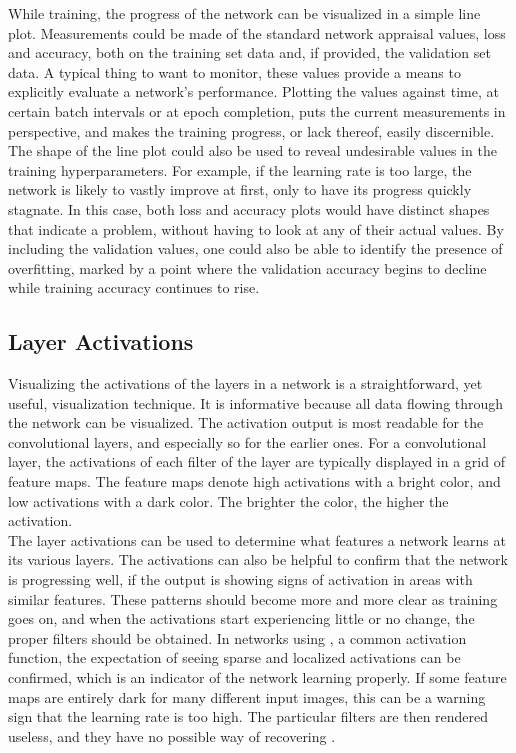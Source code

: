 While training, the progress of the network can be visualized in a simple line plot. Measurements could be made of the standard network appraisal values, loss and accuracy, both on the training set data and, if provided, the validation set data. A typical thing to want to monitor, these values provide a means to explicitly evaluate a network's performance. Plotting the values against time, at certain batch intervals or at epoch completion, puts the current measurements in perspective, and makes the training progress, or lack thereof, easily discernible. The shape of the line plot could also be used to reveal undesirable values in the training hyperparameters. For example, if the learning rate is too large, the network is likely to vastly improve at first, only to have its progress quickly stagnate. In this case, both loss and accuracy plots would have distinct shapes that indicate a problem, without having to look at any of their actual values. By including the validation values, one could also be able to identify the presence of overfitting, marked by a point where the validation accuracy begins to decline while training accuracy continues to rise.

\subsection{Layer Activations}

Visualizing the activations of the layers in a network is a straightforward, yet useful, visualization technique. It is informative because all data flowing through the network can be visualized. The activation output is most readable for the convolutional layers, and especially so for the earlier ones. For a convolutional layer, the activations of each filter of the layer are typically displayed in a grid of feature maps. The feature maps denote high activations with a bright color, and low activations with a dark color. The brighter the color, the higher the activation. \\

\noindent The layer activations can be used to determine what features a network learns at its various layers. The activations can also be helpful to confirm that the network is progressing well, if the output is showing signs of activation in areas with similar features. These patterns should become more and more clear as training goes on, and when the activations start experiencing little or no change, the proper filters should be obtained. In networks using , a common activation function, the expectation of seeing sparse and localized activations can be confirmed, which is an indicator of the network learning properly. If some feature maps are entirely dark for many different input images, this can be a warning sign that the learning rate is too high. The particular filters are then rendered useless, and they have no possible way of recovering \cite{cs231n_act}.

